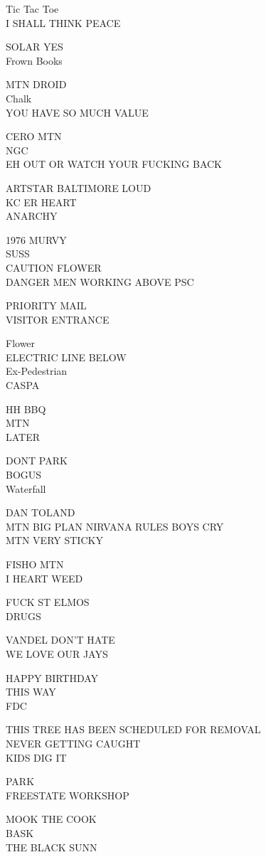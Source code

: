 \documentclass[10pt,letterpaper]{article}
\begin{document}
Tic Tac Toe\\
I SHALL THINK PEACE

SOLAR YES\\
Frown Books

MTN DROID\\
Chalk\\
YOU HAVE SO MUCH VALUE

CERO MTN\\
NGC\\
EH OUT OR WATCH YOUR FUCKING BACK

ARTSTAR BALTIMORE LOUD\\
KC ER HEART\\
ANARCHY

1976 MURVY\\
SUSS\\
CAUTION FLOWER\\
DANGER MEN WORKING ABOVE PSC

PRIORITY MAIL\\
VISITOR ENTRANCE

Flower\\
ELECTRIC LINE BELOW\\
Ex{-}Pedestrian\\
CASPA

HH BBQ\\
MTN\\
LATER

DONT PARK\\
BOGUS\\
Waterfall

DAN TOLAND\\
MTN BIG PLAN NIRVANA RULES BOYS CRY\\
MTN VERY STICKY

FISHO MTN\\
I HEART WEED

FUCK ST ELMOS\\
DRUGS

VANDEL DON'T HATE\\
WE LOVE OUR JAYS

HAPPY BIRTHDAY\\
THIS WAY\\
FDC

THIS TREE HAS BEEN SCHEDULED FOR REMOVAL\\
NEVER GETTING CAUGHT\\
KIDS DIG IT

PARK\\
FREESTATE WORKSHOP

MOOK THE COOK\\
BASK\\
THE BLACK SUNN
\end{document}
